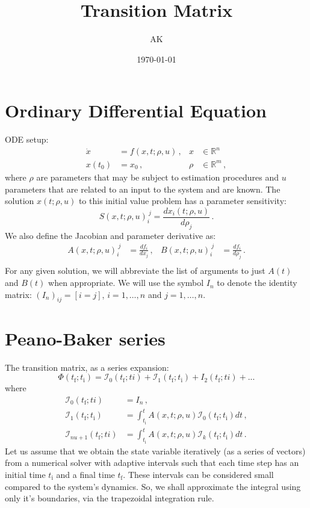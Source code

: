 \documentclass[utf8,english,DIV=12]{scrartcl}
\author{AK}
\date{\today}
\title{Transition Matrix}
\newcommand{\ti}{\ensuremath{t_{\text{i}}}}
\newcommand{\tf}{\ensuremath{t_{\text{f}}}}
\newcommand{\I}{\ensuremath{\mathcal{I}}}
\newcommand{\eye}[1]{\ensuremath{I_{#1}}}
\begin{document}
\maketitle

\section{Ordinary Differential Equation}
\label{sec:ODEs}

ODE setup:
\begin{align}
  \dot x&=f(x,t;\rho,u)\,,&x&\in\mathbb{R}^n\,\label{eq:ODE}\\
  x(t_0)&=x_0\,,&\rho&\in\mathbb{R}^m\,,
\end{align}
where $\rho$ are parameters that may be subject to estimation
procedures and $u$ parameters that are related to an input to the
system and are known. The solution $x(t;\rho,u)$ to this initial value problem has a
parameter sensitivity:
\begin{equation}
  \label{eq:sens}
  S(x,t;\rho,u)_i^{~j}=\frac{dx_i(t;\rho,u)}{d\rho_j}\,.
\end{equation}
We also define the Jacobian and parameter derivative as:
\begin{align}
  \label{eq:AB}
  A(x,t;\rho,u)_i^{~j} &= \frac{df_i}{dx_j}\,,&  B(x,t;\rho,u)_i^{~j} &= \frac{df_i}{d\rho_j}\,.\\
\end{align}
For any given solution, we will abbreviate the list of arguments to
just $A(t)$ and $B(t)$ when appropriate. We will use the symbol $\eye{n}$ to denote the identity matrix: $(\eye{n})_{ij}=[i=j]$, $i=1,\dots,n$ and $j=1,\dots,n$.

\section{Peano-Baker series}

The transition matrix, as a series expansion:
\begin{equation}
  \label{eq:PHI}
  \Phi(\tf;\ti)=\I_0(\tf;ti) + \I_1(\tf;\ti) + I_2(\tf;ti) + ...
\end{equation}
where
\begin{equation}
  \label{eq:I}
  \begin{split}
    \I_0(\tf;ti)&=\eye{n}\,,\\
    \I_1(\tf;\ti)&=\int_{\ti}^{t}A(x,t;\rho,u) \I_0(\tf;\ti) dt\,,\\
    \I_{nu+1}(\tf;ti)&=\int_{\ti}^{t}A(x,t;\rho,u) \I_k(\tf;\ti) dt\,.
  \end{split}
\end{equation}
Let us assume that we obtain the state variable iteratively (as a
series of vectors) from a numerical solver with adaptive intervals
such that each time step has an initial time $\ti$ and a final time
$\tf$. These intervals can be considered small compared to the
system's dynamics. So, we shall approximate the integral using only
it's boundaries, via the trapezoidal integration rule.
\end{document}
